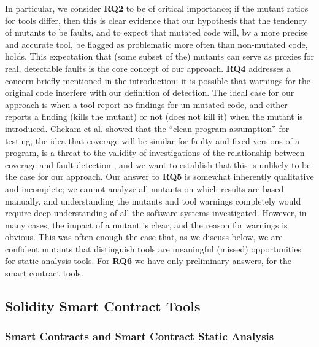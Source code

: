 In particular, we consider {\bf RQ2} to be of critical importance; if the mutant ratios for tools differ, then this is clear evidence that our hypothesis that the tendency of mutants to be faults, and to expect that mutated code will, by a more precise and accurate tool, be flagged as problematic more often than non-mutated code, holds.  This expectation that (some subset of the) mutants can serve as proxies for real, detectable faults is the core concept of our approach.
{\bf RQ4} addresses a concern briefly mentioned in the introduction:  it is possible that warnings for the original code interfere with our definition of detection.  The ideal case for our approach is when a tool report no findings for un-mutated code, and either reports a finding (kills the mutant) or not (does not kill it) when the mutant is introduced.  Chekam et al. showed that the ``clean program assumption'' for testing, the idea that coverage will be similar for faulty and fixed versions of a program, is a threat to the validity of investigations of the relationship between coverage and fault detection \cite{CleanProgram}, and we want to establish that this is unlikely to be the case for our approach.  Our answer to {\bf RQ5} is somewhat inherently qualitative and incomplete; we cannot analyze all mutants on which results are based manually, and understanding the mutants and tool warnings completely would require deep understanding of all the software systems investigated.  However, in many cases, the impact of a mutant is clear, and the reason for warnings is obvious.  This was often enough the case that, as we discuss below, we are confident mutants that distinguish tools are meaningful (missed) opportunities for static analysis tools.
For {\bf RQ6}  we have only preliminary answers, for the smart contract tools.  

\subsection{Solidity Smart Contract Tools}

\subsubsection{Smart Contracts and Smart Contract Static Analysis}

